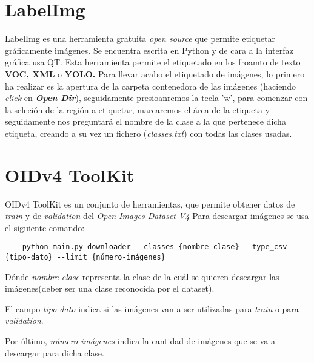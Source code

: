 \clearpage

\section{LabelImg}
LabelImg \cite{labelImg} es una herramienta gratuita \textit{open source} que permite etiquetar gráficamente imágenes. Se encuentra escrita en Python y de cara a la interfaz gráfica usa QT.
Esta herramienta permite el etiquetado en los froamto de texto \textbf{VOC, XML} o \textbf{YOLO.}
Para llevar acabo el etiquetado de imágenes, lo primero ha realizar es la apertura de la carpeta contenedora de las imágenes (haciendo \textit{click} en \textbf{\textit{Open Dir}}), seguidamente presioanremos la tecla 'w', para comenzar con la seleción de la región a etiquetar, marcaremos el área de la etiqueta y seguidamente nos preguntará el nombre de la clase a la que pertenece dicha etiqueta, creando a su vez un fichero (\textit{classes.txt}) con todas las clases usadas.


\clearpage

\section{OIDv4 ToolKit}
OIDv4 ToolKit \cite{OIDv4TK} es un conjunto de herramientas, que permite obtener datos de \textit{train} y de \textit{validation} del \textit{Open Images Dataset V4} 
Para descargar imágenes se usa el siguiente comando:
\tiny \begin{verbatim}
    python main.py downloader --classes {nombre-clase} --type_csv {tipo-dato} --limit {número-imágenes}
\end{verbatim} 
\normalsize

Dónde \textit{nombre-clase} representa la clase de la cuál se quieren descargar las imágenes(deber ser una clase reconocida por el dataset). 

El campo \textit{tipo-dato} indica si las imágenes van a ser utilizadas para \textit{train} o para \textit{validation}.

Por último, \textit{número-imágenes} indica la cantidad de imágenes que se va a descargar para dicha clase.

